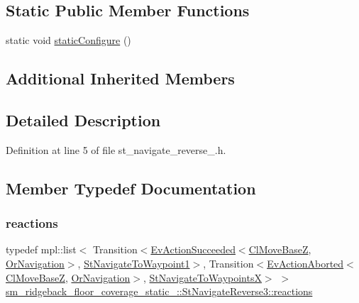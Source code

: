 \subsection*{Static Public Member Functions}
\begin{DoxyCompactItemize}
\item 
static void \hyperlink{structsm__ridgeback__floor__coverage__static__1_1_1StNavigateReverse3_a9eb3b774beb0ba424fdd05a50b5c005a}{static\+Configure} ()
\end{DoxyCompactItemize}
\subsection*{Additional Inherited Members}


\subsection{Detailed Description}


Definition at line 5 of file st\+\_\+navigate\+\_\+reverse\+\_.\+h.



\subsection{Member Typedef Documentation}
\mbox{\label{structsm__ridgeback__floor__coverage__static__1_1_1StNavigateReverse3_a02957f2ef7048ec2298b5137e46ea558}} 
\subsubsection{\texorpdfstring{reactions}{reactions}}
{\footnotesize\ttfamily typedef mpl\+::list$<$ Transition$<$\hyperlink{structsmacc_1_1default__events_1_1EvActionSucceeded}{Ev\+Action\+Succeeded}$<$\hyperlink{classcl__move__base__z_1_1ClMoveBaseZ}{Cl\+Move\+BaseZ}, \hyperlink{classsm__ridgeback__floor__coverage__static__1_1_1OrNavigation}{Or\+Navigation}$>$, \hyperlink{structsm__ridgeback__floor__coverage__static__1_1_1StNavigateToWaypoint1}{St\+Navigate\+To\+Waypoint1}$>$, Transition$<$\hyperlink{structsmacc_1_1default__events_1_1EvActionAborted}{Ev\+Action\+Aborted}$<$\hyperlink{classcl__move__base__z_1_1ClMoveBaseZ}{Cl\+Move\+BaseZ}, \hyperlink{classsm__ridgeback__floor__coverage__static__1_1_1OrNavigation}{Or\+Navigation}$>$, \hyperlink{structsm__ridgeback__floor__coverage__static__1_1_1StNavigateToWaypointsX}{St\+Navigate\+To\+WaypointsX}$>$ $>$ \hyperlink{structsm__ridgeback__floor__coverage__static__1_1_1StNavigateReverse3_a02957f2ef7048ec2298b5137e46ea558}{sm\+\_\+ridgeback\+\_\+floor\+\_\+coverage\+\_\+static\+\_\+::\+St\+Navigate\+Reverse3\+::reactions}}



